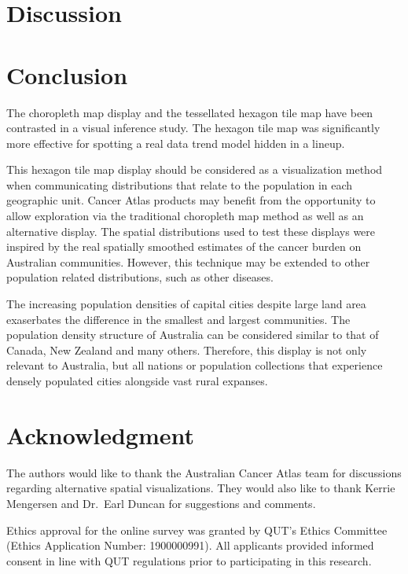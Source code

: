 \documentclass[conference,final,]{IEEEtran}
\begin{document}
\hypertarget{discussion}{%
\section{Discussion}\label{discussion}}

\hypertarget{conclusion}{%
\section{Conclusion}\label{conclusion}}

The choropleth map display and the tessellated hexagon tile map have been contrasted in a visual inference study.
The hexagon tile map was significantly more effective for spotting a real data trend model hidden in a lineup.

This hexagon tile map display should be considered as a visualization method when communicating distributions that relate to the population in each geographic unit. Cancer Atlas products may benefit from the opportunity to allow exploration via the traditional choropleth map method as well as an alternative display. The spatial distributions used to test these displays were inspired by the real spatially smoothed estimates of the cancer burden on Australian communities. However, this technique may be extended to other population related distributions, such as other diseases.

The increasing population densities of capital cities despite large land area exaserbates the difference in the smallest and largest communities.
The population density structure of Australia can be considered similar to that of Canada, New Zealand and many others. Therefore, this display is not only relevant to Australia, but all nations or population collections that experience densely populated cities alongside vast rural expanses.

\hypertarget{acknowledgment}{%
\section{Acknowledgment}\label{acknowledgment}}

The authors would like to thank the Australian Cancer Atlas team for discussions regarding alternative spatial visualizations. They would also like to thank Kerrie Mengersen and Dr.~Earl Duncan for suggestions and comments.

Ethics approval for the online survey was granted by QUT's Ethics Committee (Ethics Application Number: 1900000991). All applicants provided informed consent in line with QUT regulations prior to participating in this research.
\end{document}
